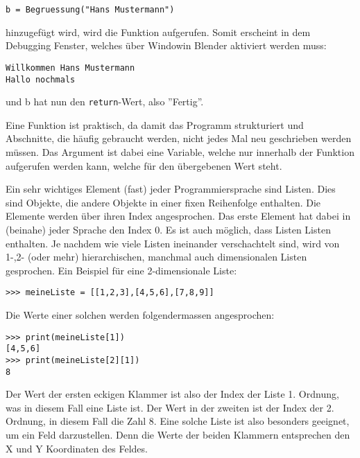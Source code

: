 \documentclass[12pt,twoside]{book}
\begin{document}
\begin{lstlisting}
b = Begruessung("Hans Mustermann")
\end{lstlisting}

hinzugef\"ugt wird, wird die Funktion aufgerufen. Somit erscheint in dem Debugging Fenster, welches \"uber \glqq Window\grqq{ }in Blender aktiviert werden muss:

\begin{lstlisting}
Willkommen Hans Mustermann
Hallo nochmals
\end{lstlisting}

und b hat nun den \texttt{return}-Wert, also ''Fertig''.

Eine Funktion ist praktisch, da damit das Programm strukturiert und Abschnitte, die h\"aufig gebraucht werden, nicht jedes Mal neu geschrieben werden m\"ussen. Das Argument ist dabei eine Variable, welche nur innerhalb der Funktion aufgerufen werden kann, welche f\"ur den \"ubergebenen Wert steht.

Ein sehr wichtiges Element (fast) jeder Programmiersprache sind Listen.
Dies sind Objekte, die andere Objekte in einer fixen Reihenfolge enthalten. Die Elemente werden \"uber ihren Index angesprochen. Das erste Element hat dabei in (beinahe) jeder Sprache den Index 0.
Es ist auch m\"oglich, dass Listen Listen enthalten. Je nachdem wie viele Listen ineinander verschachtelt sind, wird von 1-,2- (oder mehr) hierarchischen, manchmal auch dimensionalen Listen gesprochen.
Ein Beispiel f\"ur eine 2-dimensionale Liste:
\begin{lstlisting}
>>> meineListe = [[1,2,3],[4,5,6],[7,8,9]]
\end{lstlisting}

Die Werte einer solchen werden folgendermassen angesprochen:
\begin{lstlisting}
>>> print(meineListe[1])
[4,5,6]
>>> print(meineListe[2][1])
8
\end{lstlisting}
Der Wert der ersten eckigen Klammer ist also der Index der Liste 1. Ordnung, was in diesem Fall eine Liste ist.
Der Wert in der zweiten ist der Index der 2. Ordnung, in diesem Fall die Zahl 8.
Eine solche Liste ist also besonders geeignet, um ein Feld darzustellen.
Denn die Werte der beiden Klammern entsprechen den X und Y Koordinaten des Feldes.
\end{document}
